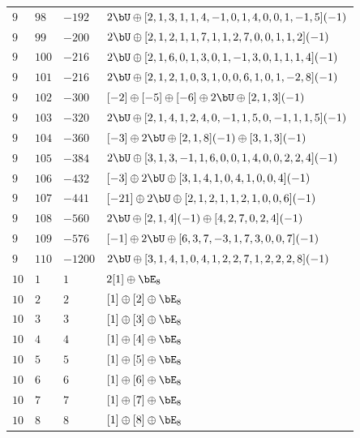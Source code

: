 \begin{center}
\begin{longtable}{llll}
 \(9\) & \(98\) & \(-192\) & \(2 \bU \oplus [2, 1, 3, 1, 1, 4, -1, 0, 1, 4, 0, 0, 1, -1, 5](-1)\) \\
 \(9\) & \(99\) & \(-200\) & \(2 \bU \oplus [2, 1, 2, 1, 1, 7, 1, 1, 2, 7, 0, 0, 1, 1, 2](-1)\) \\
 \(9\) & \(100\) & \(-216\) & \(2 \bU \oplus [2, 1, 6, 0, 1, 3, 0, 1, -1, 3, 0, 1, 1, 1, 4](-1)\) \\
 \(9\) & \(101\) & \(-216\) & \(2 \bU \oplus [2, 1, 2, 1, 0, 3, 1, 0, 0, 6, 1, 0, 1, -2, 8](-1)\) \\
 \(9\) & \(102\) & \(-300\) & \([-2] \oplus [-5] \oplus [-6] \oplus 2 \bU \oplus [2, 1, 3](-1)\) \\
 \(9\) & \(103\) & \(-320\) & \(2 \bU \oplus [2, 1, 4, 1, 2, 4, 0, -1, 1, 5, 0, -1, 1, 1, 5](-1)\) \\
 \(9\) & \(104\) & \(-360\) & \([-3] \oplus 2 \bU \oplus [2, 1, 8](-1) \oplus [3, 1, 3](-1)\) \\
 \(9\) & \(105\) & \(-384\) & \(2 \bU \oplus [3, 1, 3, -1, 1, 6, 0, 0, 1, 4, 0, 0, 2, 2, 4](-1)\) \\
 \(9\) & \(106\) & \(-432\) & \([-3] \oplus 2 \bU \oplus [3, 1, 4, 1, 0, 4, 1, 0, 0, 4](-1)\) \\
 \(9\) & \(107\) & \(-441\) & \([-21] \oplus 2 \bU \oplus [2, 1, 2, 1, 1, 2, 1, 0, 0, 6](-1)\) \\
 \(9\) & \(108\) & \(-560\) & \(2 \bU \oplus [2, 1, 4](-1) \oplus [4, 2, 7, 0, 2, 4](-1)\) \\
 \(9\) & \(109\) & \(-576\) & \([-1] \oplus 2 \bU \oplus [6, 3, 7, -3, 1, 7, 3, 0, 0, 7](-1)\) \\
 \(9\) & \(110\) & \(-1200\) & \(2 \bU \oplus [3, 1, 4, 1, 0, 4, 1, 2, 2, 7, 1, 2, 2, 2, 8](-1)\) \\
\midrule
 \(10\) & \(1\) & \(1\) & \(2 [1] \oplus \bE_{8}\) \\
 \(10\) & \(2\) & \(2\) & \([1] \oplus [2] \oplus \bE_{8}\) \\
 \(10\) & \(3\) & \(3\) & \([1] \oplus [3] \oplus \bE_{8}\) \\
 \(10\) & \(4\) & \(4\) & \([1] \oplus [4] \oplus \bE_{8}\) \\
 \(10\) & \(5\) & \(5\) & \([1] \oplus [5] \oplus \bE_{8}\) \\
 \(10\) & \(6\) & \(6\) & \([1] \oplus [6] \oplus \bE_{8}\) \\
 \(10\) & \(7\) & \(7\) & \([1] \oplus [7] \oplus \bE_{8}\) \\
 \(10\) & \(8\) & \(8\) & \([1] \oplus [8] \oplus \bE_{8}\) \\

\end{longtable}
\end{center}
